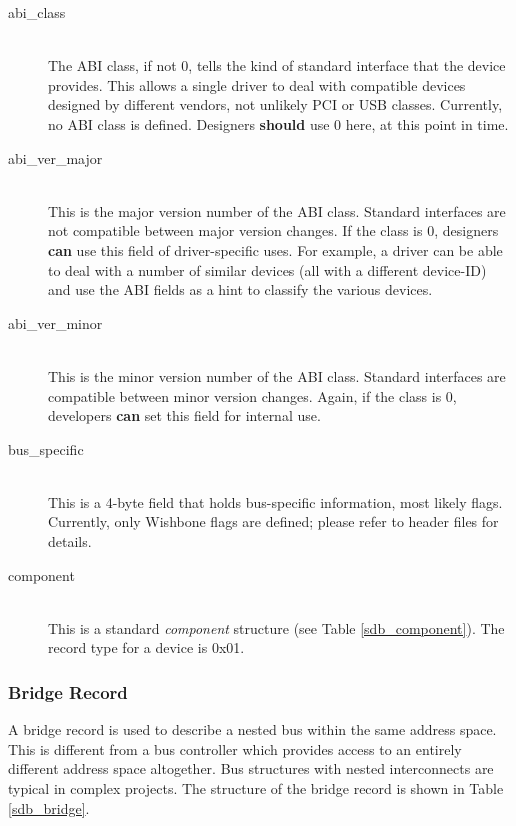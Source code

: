 \documentclass[a4paper, 12pt]{article}
\begin{document}
\begin{description}
\item[abi\_class] \hfill \\
The ABI class, if not 0, tells the kind of standard interface that the device provides. This
allows a single driver to deal with compatible devices designed by different vendors, not unlikely
PCI or USB classes.  Currently, no ABI class is defined. Designers \textbf{should} use 0 here,
at this point in time.

\item[abi\_ver\_major] \hfill \\
This is the major version number of the ABI class. Standard interfaces are not compatible between
major version changes.  If the class is 0, designers \textbf{can} use this field of driver-specific uses. For
example, a driver can be able to deal with a number of similar devices (all with a different device-ID)
and use the ABI fields as a hint to classify the various devices.

\item[abi\_ver\_minor] \hfill \\
This is the minor version number of the ABI class. Standard interfaces are compatible between
minor version changes. Again, if the class is 0, developers \textbf{can} set this field for internal use.

\item[bus\_specific] \hfill \\
This is a 4-byte field that holds bus-specific information, most likely flags. Currently, only
Wishbone flags are defined; please refer to header files for details.

\item[component] \hfill \\
This is a standard \textit{component} structure (see Table \ref{sdb_component}). The record type
for a device is 0x01.
\end{description}

\subsubsection{Bridge Record}

A bridge record is used to describe a nested bus within the same address space. This is different from
a bus controller which provides access to an entirely different address space altogether. Bus
structures with nested interconnects are typical in complex projects.
The structure of the bridge record is shown in Table \ref{sdb_bridge}.
\end{document}

